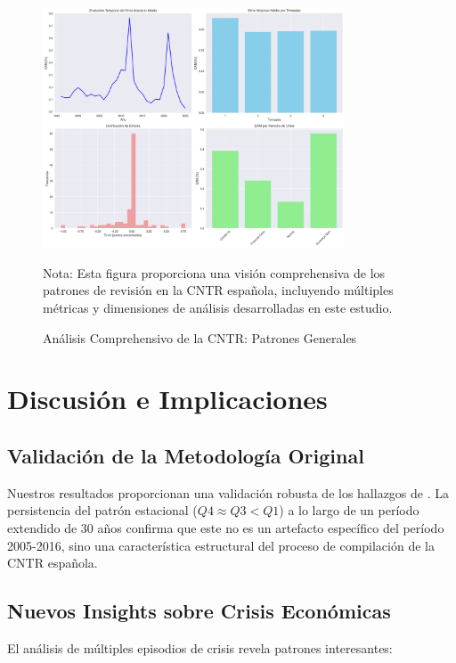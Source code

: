 \documentclass{article}
\begin{document}
\begin{figure}[h]
\centering
\includegraphics[width=0.8\textwidth]{../figuras/analisis_cntr_graficos.png}
\caption{Análisis Comprehensivo de la CNTR: Patrones Generales}
\label{fig:analisis_general}
\begin{flushleft}
\footnotesize
Nota: Esta figura proporciona una visión comprehensiva de los patrones de revisión en la CNTR española, incluyendo múltiples métricas y dimensiones de análisis desarrolladas en este estudio.
\end{flushleft}
\end{figure}

\section{Discusión e Implicaciones}

\subsection{Validación de la Metodología Original}

Nuestros resultados proporcionan una validación robusta de los hallazgos de \citet{pavia2017}. La persistencia del patrón estacional ($Q4 \approx Q3 < Q1$) a lo largo de un período extendido de 30 años confirma que este no es un artefacto específico del período 2005-2016, sino una característica estructural del proceso de compilación de la CNTR española.

\subsection{Nuevos Insights sobre Crisis Económicas}

El análisis de múltiples episodios de crisis revela patrones interesantes:
\end{document}
